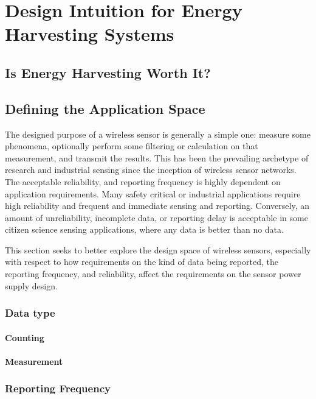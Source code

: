\chapter{Design Intuition for Energy Harvesting Systems}
\label{chap:intuition}

\section{Is Energy Harvesting Worth It?}


\section{Defining the Application Space}
The designed purpose of a wireless sensor is generally a simple one: measure some phenomena, optionally perform some filtering or calculation on that measurement, and transmit the results. 
This has been the prevailing archetype of research and industrial sensing since the inception of wireless sensor networks. 
The acceptable reliability, and reporting frequency is highly dependent on application requirements. Many safety critical or industrial applications require high reliability and frequent and immediate sensing and reporting. Conversely, an amount of unreliability, incomplete data, or reporting delay is acceptable in some citizen science sensing applications, where any data is better than no data.

This section seeks to better explore the design space of wireless sensors, especially with respect to how requirements on the kind of data being reported, the reporting frequency, and reliability, affect the requirements on the sensor power supply design. 

\subsection{Data type}

\subsubsection{Counting}

\subsubsection{Measurement}

\subsection{Reporting Frequency}

